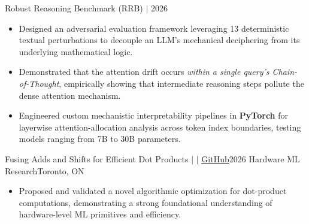 \documentclass[9pt, letterpaper]{extarticle}
\newcommand{\resumeItem}[1]{\item\small{#1}}
\begin{document}
\begin{itemize}[leftmargin=0.15pt]
  \resumeSubheading
    {Robust Reasoning Benchmark (RRB) $\vert$ }{2026}
    \begin{itemize}[leftmargin=0.15in, topsep=2pt]
        \resumeItem{Designed an adversarial evaluation framework leveraging 13 deterministic textual perturbations to decouple an LLM's mechanical deciphering from its underlying mathematical logic.}
        \resumeItem{Demonstrated that the attention drift occurs \textit{within a single query's Chain-of-Thought}, empirically showing that intermediate reasoning steps pollute the dense attention mechanism.}
        \resumeItem{Engineered custom mechanistic interpretability pipelines in \textbf{PyTorch} for layerwise attention-allocation analysis across token index boundaries, testing models ranging from 7B to 30B parameters.}
    \end{itemize}

  \resumeSubheading
    {Fusing Adds and Shifts for Efficient Dot Products $\vert$  $\vert$ \href{https://github.com/mcj-group/fased-verilog.git}{GitHub}}{2026}
    {Hardware ML Research}{Toronto, ON}
    \begin{itemize}[leftmargin=0.15in, topsep=2pt]
        \resumeItem{Proposed and validated a novel algorithmic optimization for dot-product computations, demonstrating a strong foundational understanding of hardware-level ML primitives and efficiency.}
    \end{itemize}

\end{itemize}

\end{document}
